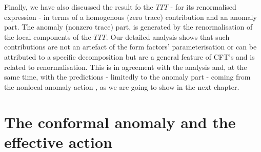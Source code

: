 \documentclass[a4paper,11pt,openright,twoside]{book}
\numberwithin{equation}{section}
\begin{document}
{{Finally, we have also discussed the result fo the $TTT$ - for its renormalised expression - in terms of a homogenous (zero trace) contribution and an anomaly part. The anomaly (nonzero trace) part, is generated by the renormalisation of 
the local components of the $TTT$.  
Our detailed analysis shows that such contributions are not an artefact of the form factors' parameterisation or can be attributed to a 
specific decomposition but are a general feature of CFT's and is related to renormalisation. This is in agreement with the analysis \cite{Bzowski:2017poo} and, at the same time, with the predictions - limitedly to the anomaly part - coming from the nonlocal anomaly action \cite{Coriano:2017mux}, as we are going to show in the next chapter. 
\chapter{The conformal anomaly and the effective action}\label{chapter3}
}}
\end{document}
